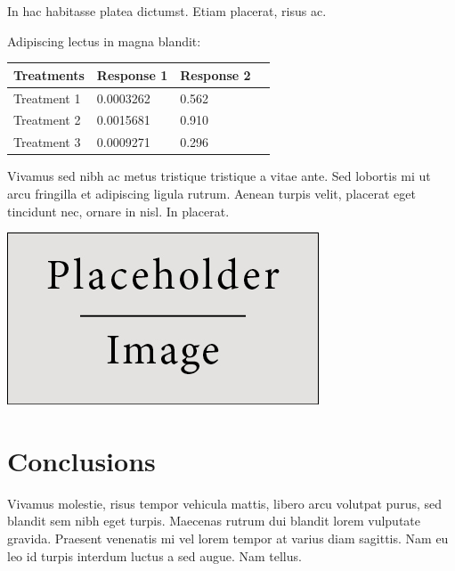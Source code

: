 \documentclass[a0,landscape]{a0poster}
\begin{document}
\begin{multicols}{3}
In hac habitasse platea dictumst. Etiam placerat, risus ac.

Adipiscing lectus in magna blandit:

\begin{center}\vspace{1cm}
\begin{tabular}{l l l l}
\toprule
\textbf{Treatments} & \textbf{Response 1} & \textbf{Response 2} \\
\midrule
Treatment 1 & 0.0003262 & 0.562 \\
Treatment 2 & 0.0015681 & 0.910 \\
Treatment 3 & 0.0009271 & 0.296 \\
\bottomrule
\end{tabular}
\end{center}\vspace{1cm}

Vivamus sed nibh ac metus tristique tristique a vitae ante. Sed lobortis mi ut arcu fringilla et adipiscing ligula rutrum. Aenean turpis velit, placerat eget tincidunt nec, ornare in nisl. In placerat.

\begin{center}\vspace{1cm}
\includegraphics[width=0.8\linewidth]{placeholder}
\end{center}\vspace{1cm}


\color{SaddleBrown} %

\section*{Conclusions}
Vivamus molestie, risus tempor vehicula mattis, libero arcu volutpat purus, sed blandit sem nibh eget turpis. Maecenas rutrum dui blandit lorem vulputate gravida. Praesent venenatis mi vel lorem tempor at varius diam sagittis. Nam eu leo id turpis interdum luctus a sed augue. Nam tellus.


\end{multicols}
\end{document}
